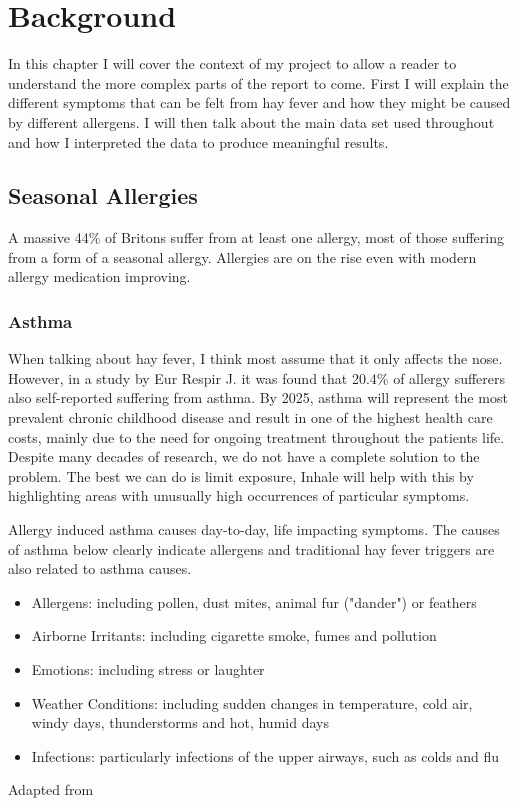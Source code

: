 \chapter{Background}
\label{cha:back}

In this chapter I will cover the context of my project to allow a reader to understand the more complex parts of the report to come. First I will explain the different symptoms that can be felt from hay fever and how they might be caused by different allergens. I will then talk about the main data set used throughout and how I interpreted the data to produce meaningful results.

\section{Seasonal Allergies}
A massive 44\% of Britons suffer from at least one allergy, most of those suffering from a form of a seasonal allergy. Allergies are on the rise even with modern allergy medication improving.
\cite{mintelallergy}

\subsection{Asthma}
When talking about hay fever, I think most assume that it only affects the nose. However, in a study by Eur Respir J. it was found that 20.4\% of allergy sufferers also self-reported suffering from asthma\cite{rhinitis}. By 2025, asthma will represent the most prevalent chronic childhood disease and result in one of the highest health care costs, mainly due to the need for ongoing treatment throughout the patients life\cite{childhood}. Despite many decades of research, we do not have a complete solution to the problem. The best we can do is limit exposure, Inhale will help with this by highlighting areas with unusually high occurrences of particular symptoms.

Allergy induced asthma causes day-to-day, life impacting symptoms. The causes of asthma below clearly indicate allergens and traditional hay fever triggers are also related to asthma causes.\\


\begin{itemize}
  \item Allergens: including pollen, dust mites, animal fur ("dander") or feathers
  \item Airborne Irritants: including cigarette smoke, fumes and pollution
  \item Emotions: including stress or laughter
  \item Weather Conditions: including sudden changes in temperature, cold air, windy days, thunderstorms and hot, humid days
  \item Infections: particularly infections of the upper airways, such as colds and flu
\end{itemize}\begin{center}Adapted from \cite{urlasthmacauses}\end{center}\\

